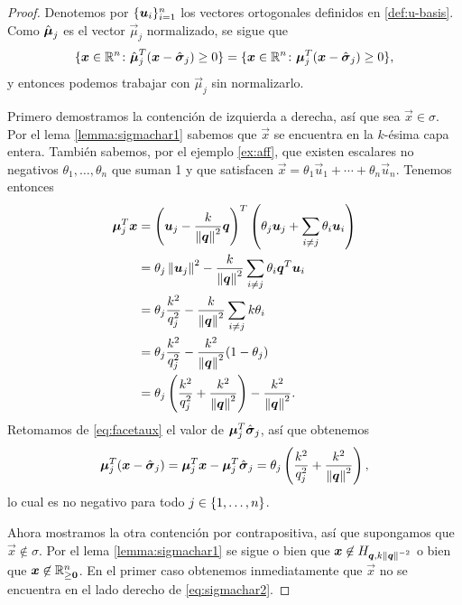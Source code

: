 \begin{proof}
	Denotemos por $\lbrace \boldsymbol{u}_i \rbrace_{i=1}^{n}$ los vectores ortogonales definidos en
	\eqref{def:u-basis}. Como $\hat{\boldsymbol{\mu}}_j$ es el vector $\vec{\mu}_j$ normalizado, se sigue que
	\begin{equation*}
		\lbrace  \boldsymbol{x} \in \mathbb{R}^n \colon \hat{\boldsymbol{\mu}}_j^T(\boldsymbol{x} - \hat{\boldsymbol{ \sigma }}_j) \geq 0 \rbrace
		=
		\lbrace  \boldsymbol{x} \in \mathbb{R}^n \colon \boldsymbol{\mu}_j^T(\boldsymbol{x} - \hat{\boldsymbol{ \sigma }}_j) \geq 0 \rbrace,
	\end{equation*}
	y entonces podemos trabajar con $\vec{\mu}_j$ sin normalizarlo. 

	Primero demostramos la contención de izquierda a derecha, así que sea
	$\vec{x} \in \sigma$. Por el lema \ref{lemma:sigmachar1} sabemos que
	$\vec{x}$ se encuentra en la $k$-ésima capa entera. También sabemos, por el
	ejemplo \ref{ex:aff}, que existen escalares no negativos $\theta_1, \ldots,
	\theta_n$ que suman 1 y que satisfacen $\vec{x} = \theta_1\vec{u}_1 +
	\cdots + \theta_n\vec{u}_n$. Tenemos entonces
	\begin{align*}
		\boldsymbol{\mu}_j^T\boldsymbol{x}
		&=
		\left(\boldsymbol{u}_j - \frac{k}{\left\lVert \boldsymbol{q} \right\rVert^2}\boldsymbol{q}\right)^T
		\left(\theta_j\boldsymbol{u}_j + \sum_{i \neq j}\theta_i\boldsymbol{u}_i\right) \\
		&= \theta_j\left\lVert \boldsymbol{u}_j \right\rVert^2 - \frac{k}{\left\lVert \boldsymbol{q} \right\rVert^2}\sum_{i \neq j}
		\theta_i\boldsymbol{q}^T\boldsymbol{u}_i \\
		&= \theta_j\frac{k^2}{q_j^2} - \frac{k}{\left\lVert \boldsymbol{q} \right\rVert^2}\sum_{i \neq j}k\theta_i \\
		&= \theta_j\frac{k^2}{q_j^2} - \frac{k^2}{\left\lVert \boldsymbol{q} \right\rVert^2}(1 - \theta_j) \\
		&= \theta_j\left(\frac{k^2}{q_j^2} + \frac{k^2}{\left\lVert \boldsymbol{q} \right\rVert^2}\right)
		- \frac{k^2}{\left\lVert \boldsymbol{q} \right\rVert^2}.
	\end{align*}
	Retomamos de \eqref{eq:facetaux} el valor de $\boldsymbol{\mu}_j^T\hat{\boldsymbol{ \sigma }}_j$, así que obtenemos
	\begin{equation*}
		\boldsymbol{\mu}_j^T(\boldsymbol{x} - \hat{\boldsymbol{ \sigma }}_j)
		= 
		\boldsymbol{\mu}_j^T\boldsymbol{x} - \boldsymbol{\mu}_j^T\hat{\boldsymbol{ \sigma }}_j
		=
		\theta_j\left(\frac{k^2}{q_j^2} + \frac{k^2}{\left\lVert \boldsymbol{q} \right\rVert^2}\right),
	\end{equation*}
	lo cual es no negativo para todo $j \in \lbrace 1, \ldots, n \rbrace$.

	Ahora mostramos la otra contención por contrapositiva, así que supongamos
	que $\vec{x} \not\in \sigma$. Por el lema \ref{lemma:sigmachar1} se sigue o
	bien que $\boldsymbol{x} \not\in H_{\boldsymbol{q}, k\left\lVert \boldsymbol{q} \right\rVert^{-2}}$ o bien que
	$\boldsymbol{x} \not\in \mathbb{R}^n_{\geq \boldsymbol{0}}$. En el primer caso obtenemos
	inmediatamente que $\vec{x}$ no se encuentra en el lado derecho de
	\eqref{eq:sigmachar2}.


\end{proof}
